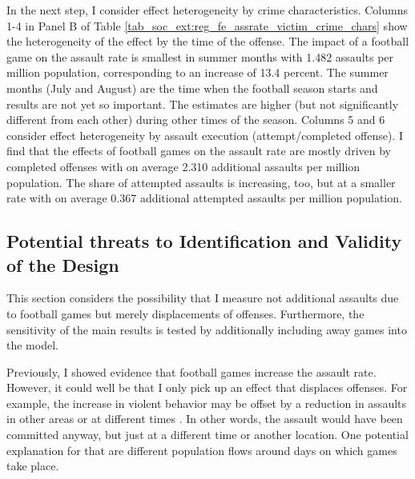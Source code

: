 

In the next step, I consider effect heterogeneity by crime characteristics. Columns 1-4 in Panel B of Table \ref{tab_soc_ext:reg_fe_assrate_victim_crime_chars} show the heterogeneity of the effect by the time of the offense. The impact of a football game on the assault rate is smallest in summer months with 1.482 assaults per million population, corresponding to an increase of 13.4 percent. The summer months (July and August) are the time when the football season starts and results are not yet so important. The estimates are higher (but not significantly different from each other) during other times of the season. Columns 5 and 6 consider effect heterogeneity by assault execution (attempt/completed offense). I find that the effects of football games on the assault rate are mostly driven by completed offenses with on average 2.310 additional assaults per million population. The share of attempted assaults is increasing, too, but at a smaller rate with on average 0.367 additional attempted assaults per million population.




\subsection{Potential threats to Identification and Validity of the Design}\label{sec_soc_ext: threats}
This section considers the possibility that I measure not additional assaults due to football games but merely displacements of offenses. Furthermore, the sensitivity of the main results is tested by additionally including away games into the model.

Previously, I showed evidence that football games increase the assault rate. However, it could well be that I only pick up an effect that displaces offenses. For example, the increase in violent behavior may be offset by a reduction in assaults in other areas or at different times \citep{lindo2018college}. In other words, the assault would have been committed anyway, but just at a different time or another location. One potential explanation for that are different population flows around days on which games take place.



